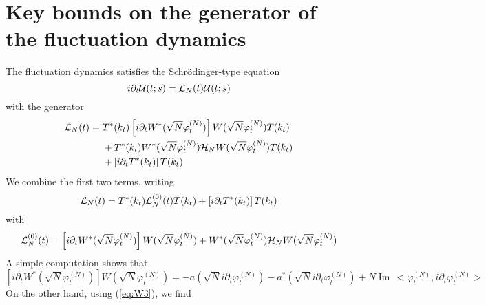 \documentclass[11pt,a4paper,DIV11]{scrartcl}	%
\newcommand{\cU}{{\cal U}}
\newcommand{\cH}{{\cal H}}
\newcommand{\cL}{{\cal L}}
\newcommand{\scal}[2]{\big<#1,#2\big>} %
\renewcommand{\Im}{\operatorname{Im}\,} 	%
\begin{document}
\section{Key bounds on the generator of the fluctuation dynamics}
\label{sec:gen-fd}

The fluctuation dynamics satisfies the Schr\"odinger-type equation
\[ i\partial_t \cU (t;s) = \cL_N (t) \cU (t;s) \]
with the generator
\[ \begin{split} \cL_N (t) = \; &T^* (k_t) \left[ i \partial_t W^* (\sqrt{N} \varphi_t^{(N)}) \right] W(\sqrt{N} \varphi_t^{(N)}) T (k_t) \\ &+ T^* (k_t) W^* (\sqrt{N} \varphi_t^{(N)}) \cH_N W (\sqrt{N} \varphi_t^{(N)}) T (k_t) \\ &+ \left[ i \partial_t T^* (k_t) \right] T(k_t)  \end{split} \]
We combine the first two terms, writing
\begin{equation}\label{eq:cLN} \cL_N (t) = T^* (k_t) \cL^{(0)}_N (t) T (k_t) + \left[ i \partial_t T^* (k_t) \right] T(k_t)  
\end{equation}
with 
\[ \cL_N^{(0)} (t) =  \left[ i \partial_t W^* (\sqrt{N} \varphi_t^{(N)}) \right] W(\sqrt{N} \varphi_t^{(N)}) + 
W^* (\sqrt{N} \varphi_t^{(N)}) \cH_N W (\sqrt{N} \varphi_t^{(N)}) \]
A simple computation shows that
\[ 
 \left[ i \partial_t W^* (\sqrt{N} \varphi_t^{(N)}) \right] W(\sqrt{N} \varphi_t^{(N)}) = - a(\sqrt{N} i \partial_t \varphi_t^{(N)}) - a^* (\sqrt{N} i \partial_t \varphi_t^{(N)}) + N \Im \scal{\varphi_t^{(N)} }{i\partial_t \varphi_t^{(N)}} \]
 On the other hand, using (\ref{eq:W3}), we find
\end{document}
